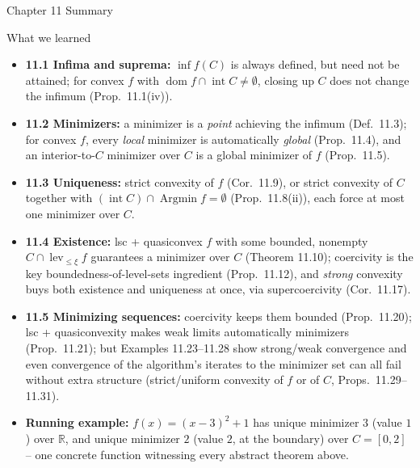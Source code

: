 \documentclass[aspectratio=169,10pt]{beamer}
\newcommand{\R}{\mathbb{R}}
\newcommand{\dom}{\operatorname{dom}}
\newcommand{\Argmin}{\operatorname{Argmin}}
\newcommand{\lev}{\operatorname{lev}}
\newcommand{\intr}{\operatorname{int}}
\begin{document}
\begin{frame}{Chapter 11 Summary}

  \begin{block}{What we learned}
    \begin{itemize}
      \item \textbf{11.1 Infima and suprema:} $\inf f(C)$ is always
            defined, but need not be attained; for convex $f$ with
            $\dom f\cap\intr C\neq\emptyset$, closing up $C$ does not
            change the infimum (Prop.\ 11.1(iv)).
      \item \textbf{11.2 Minimizers:} a minimizer is a \emph{point}
            achieving the infimum (Def.\ 11.3); for convex $f$, every
            \emph{local} minimizer is automatically \emph{global}
            (Prop.\ 11.4), and an interior-to-$C$ minimizer over $C$
            is a global minimizer of $f$ (Prop.\ 11.5).
      \item \textbf{11.3 Uniqueness:} strict convexity of $f$
            (Cor.\ 11.9), or strict convexity of $C$ together with
            $(\intr C)\cap\Argmin f=\emptyset$ (Prop.\ 11.8(ii)),
            each force at most one minimizer over $C$.
      \item \textbf{11.4 Existence:} lsc + quasiconvex $f$ with some
            bounded, nonempty $C\cap\lev_{\le\xi}f$ guarantees a
            minimizer over $C$ (Theorem 11.10); coercivity is the key
            boundedness-of-level-sets ingredient (Prop.\ 11.12), and
            \emph{strong} convexity buys both existence and
            uniqueness at once, via supercoercivity (Cor.\ 11.17).
      \item \textbf{11.5 Minimizing sequences:} coercivity keeps them
            bounded (Prop.\ 11.20); lsc + quasiconvexity makes weak
            limits automatically minimizers (Prop.\ 11.21); but
            Examples 11.23--11.28 show strong/weak convergence and
            even convergence of the algorithm's iterates to the
            minimizer set can all fail without extra structure
            (strict/uniform convexity of $f$ or of $C$, Props.\
            11.29--11.31).
      \item \textbf{Running example:} $f(x)=(x-3)^2+1$ has unique
            minimizer $3$ (value $1$) over $\R$, and unique minimizer
            $2$ (value $2$, at the boundary) over $C=[0,2]$ -- one
            concrete function witnessing every abstract theorem above.
    \end{itemize}
  \end{block}

\end{frame}
\end{document}
